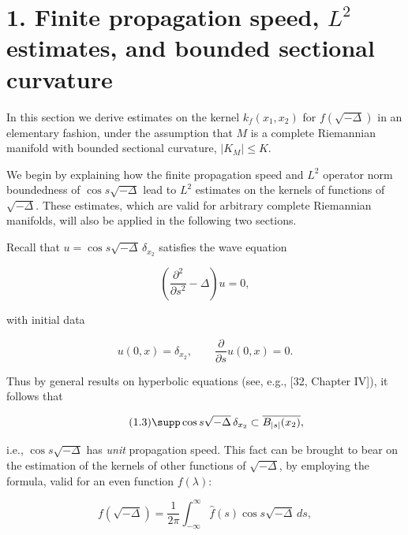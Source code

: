 \chapter{1. Finite propagation speed, \texorpdfstring{$L^2$}{L2} estimates, and bounded sectional curvature}

In this section we derive estimates on the kernel $k_f(x_1,x_2)$ for
$f(\sqrt{-\Delta})$ in an elementary fashion, under the assumption that $M$ is a
complete Riemannian manifold with bounded sectional curvature,
$\lvert K_M\rvert \leq K$.

We begin by explaining how the finite propagation speed and $L^2$ operator
norm boundedness of $\cos s\sqrt{-\Delta}$ lead to $L^2$ estimates on the
kernels of functions of $\sqrt{-\Delta}$. These estimates, which are valid for
arbitrary complete Riemannian manifolds, will also be applied in the following
two sections.

Recall that $u=\cos s\sqrt{-\Delta}\,\delta_{x_2}$ satisfies the wave equation

\begin{equation}\tag{1.1}
\left(\frac{\partial^2}{\partial s^2}-\Delta\right)u=0,
\end{equation}

with initial data

\begin{equation}\tag{1.2}
u(0,x)=\delta_{x_2}, \qquad \frac{\partial}{\partial s}u(0,x)=0.
\end{equation}

Thus by general results on hyperbolic equations (see, e.g., [32, Chapter IV]), it follows that

\begin{equation}\tag{1.3}
\supp \cos s\sqrt{-\Delta}\,\delta_{x_2}\subset \overline{B_{|s|}(x_2)},
\end{equation}

i.e., $\cos s\sqrt{-\Delta}$ has \emph{unit} propagation speed. This fact can be
brought to bear on the estimation of the kernels of other functions of
$\sqrt{-\Delta}$, by employing the formula, valid for an even function $f(\lambda)$:

\begin{equation}\tag{1.4}
f(\sqrt{-\Delta})=\frac{1}{2\pi}\int_{-\infty}^{\infty}\hat f(s)\cos s\sqrt{-\Delta}\,ds,
\end{equation}

